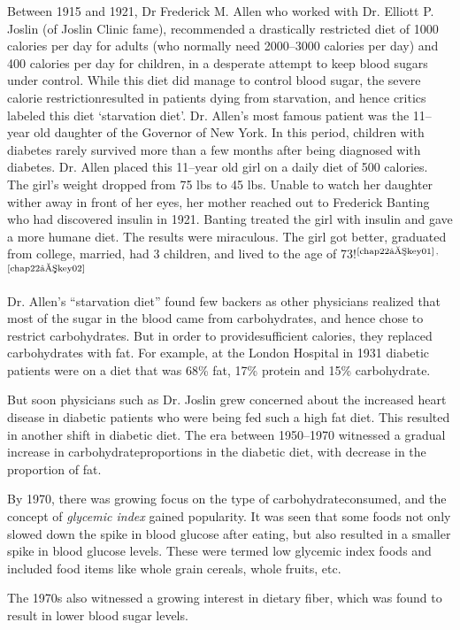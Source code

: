 Between 1915 and 1921, Dr Frederick M. Allen who worked with Dr. Elliott P. Joslin (of Joslin Clinic fame), recommended a drastically restricted diet of 1000 calories per day for adults (who normally need 2000–3000 calories per day) and 400 calories per day for children, in a desperate attempt to keep blood sugars under control. While this diet did manage to control blood sugar, the severe calorie restriction\break resulted in patients dying from starvation, and hence critics labeled this diet ‘starvation diet’. Dr. Allen’s most famous patient was the 11–year old daughter of the Governor of New York. In this period, children with diabetes rarely survived more than a few months after being dia\-gnosed with diabetes. Dr. Allen placed this 11–year old girl on a daily diet of 500 calories. The girl's weight dropped from 75 lbs to 45 lbs. Unable to watch her daughter wither away in front of her eyes, her mother reached out to Frederick Banting who had discovered insulin in 1921. Banting treated the girl with insulin and gave a more humane diet. The results were miraculous. The girl got better, graduated from college, married, had 3 children, and lived to the age of 73!$^{\text{\cite{chap22–key01}}}$$^,$$^{\text{\cite{chap22–key02}}}$

Dr. Allen’s “starvation diet” found few backers as other physicians realized that most of the sugar in the blood came from carbohydrates, and hence chose to restrict carbohydrates. But in order to provide\break sufficient calories, they replaced carbohydrates with fat. For example, at the London Hospital in 1931 diabetic patients were on a diet that was 68\% fat, 17\% protein and 15\% carbohydrate.

But soon physicians such as Dr. Joslin grew concerned about the increased heart disease in diabetic patients who were being fed such a high fat diet. This resulted in another shift in diabetic diet. The era between 1950–1970 witnessed a gradual increase in carbohydrate\break proportions in the diabetic diet, with decrease in the proportion of fat.

By 1970, there was growing focus on the type of carbohydrate\break consumed, and the concept of \textit{glycemic index} gained popularity. It was seen that some foods not only slowed down the spike in blood glucose after eating, but also resulted in a smaller spike in blood glucose levels. These were termed low glycemic index foods and included food items like whole grain cereals, whole fruits, etc.

The 1970s also witnessed a growing interest in dietary fiber, which was found to result in lower blood sugar levels.

